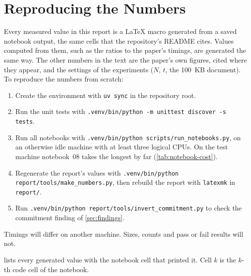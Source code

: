 \section{Reproducing the Numbers}
\label{app:reproducibility}

Every measured value in this report is a LaTeX macro generated from a saved notebook output, the same cells that
the repository's README cites. Values computed from them, such as the ratios to the paper's timings, are generated
the same way. The other numbers in the text are the paper's own figures, cited where they appear, and the settings
of the experiments ($N$, $t$, the 100~KB document). To reproduce the numbers from scratch:
\begin{enumerate}
  \item Create the environment with \texttt{uv sync} in the repository root.
  \item Run the unit tests with \texttt{.venv/bin/python -m unittest discover -s tests}.
  \item Run all notebooks with \texttt{.venv/bin/python scripts/run\_notebooks.py}, on an otherwise idle machine
        with at least three logical CPUs. On the test machine notebook~08 takes the longest by far
        (\cref{tab:notebook-cost}).
  \item Regenerate the report's values with \texttt{.venv/bin/python report/tools/make\_numbers.py}, then rebuild
        the report with \texttt{latexmk} in \texttt{report/}.
  \item Run \texttt{.venv/bin/python report/tools/invert\_commitment.py} to check the commitment finding of
        \cref{sec:findings}.
\end{enumerate}
Timings will differ on another machine. Sizes, counts and pass or fail results will not.

 lists every generated value with the notebook cell that printed it. Cell $k$ is the
$k$-th code cell of the notebook.

{\small

}
